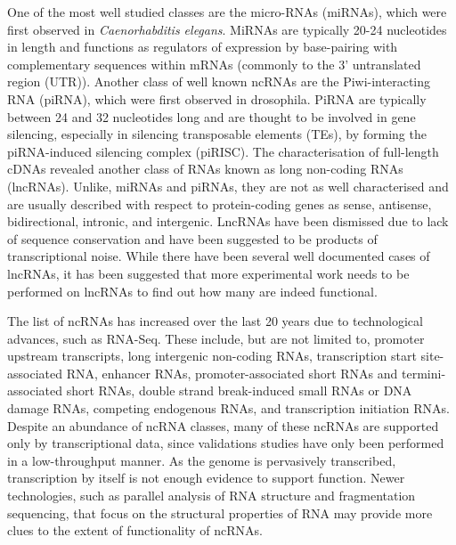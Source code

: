 One of the most well studied classes are the micro-RNAs (miRNAs), which were first observed in \textit{Caenorhabditis elegans}\cite{pmid8252621}. MiRNAs are typically 20-24 nucleotides in length and functions as regulators of expression by base-pairing with complementary sequences within mRNAs (commonly to the 3' untranslated region (UTR)). Another class of well known ncRNAs are the Piwi-interacting RNA (piRNA), which were first observed in drosophila\cite{pmid11470406}. PiRNA are typically between 24 and 32 nucleotides long and are thought to be involved in gene silencing, especially in silencing transposable elements (TEs), by forming the piRNA-induced silencing complex (piRISC). The characterisation of full-length cDNAs revealed another class of RNAs known as long non-coding RNAs (lncRNAs)\cite{pmid12466851}. Unlike, miRNAs and piRNAs, they are not as well characterised and are usually described with respect to protein-coding genes as sense, antisense, bidirectional, intronic, and intergenic\cite{pmid19239885}. LncRNAs have been dismissed due to lack of sequence conservation\cite{pmid15495343} and have been suggested to be products of transcriptional noise\cite{pmid15851066}. While there have been several well documented cases of lncRNAs, it has been suggested that more experimental work needs to be performed on lncRNAs to find out how many are indeed functional\cite{pmid23463798}.

The list of ncRNAs has increased over the last 20 years due to technological advances, such as RNA-Seq. These include, but are not limited to, promoter upstream transcripts\cite{pmid19056938}, long intergenic non-coding RNAs\cite{pmid21890647, pmid22196729, pmid2943744}, transcription start site-associated RNA\cite{pmid21822281}, enhancer RNAs\cite{pmid20393465}, promoter-associated short RNAs and termini-associated short RNAs\cite{pmid17510325}, double strand break-induced small RNAs\cite{pmid22445173} or DNA damage RNAs\cite{francia2012site}, competing endogenous RNAs\cite{pmid24429633}, and transcription initiation RNAs\cite{pmid19377478}. Despite an abundance of ncRNA classes, many of these ncRNAs are supported only by transcriptional data, since validations studies have only been performed in a low-throughput manner. As the genome is pervasively transcribed, transcription by itself is not enough evidence to support function. Newer technologies, such as parallel analysis of RNA structure\cite{pmid20811459} and fragmentation sequencing\cite{pmid21057495}, that focus on the structural properties of RNA may provide more clues to the extent of functionality of ncRNAs.


